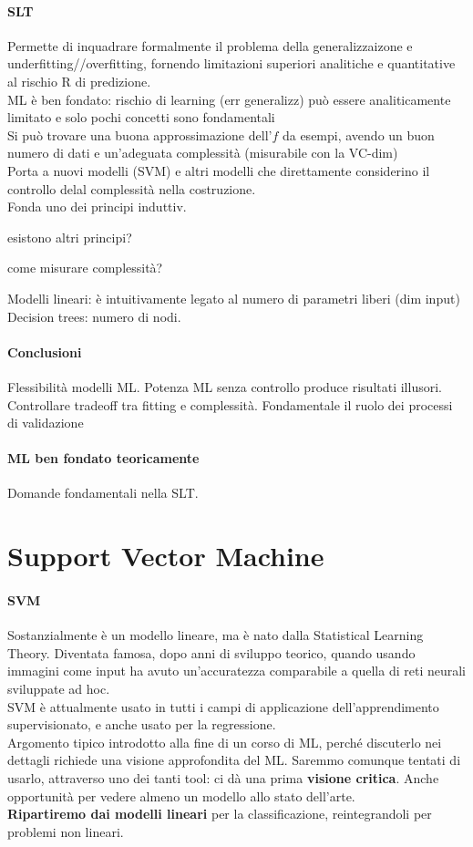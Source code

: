 \documentclass[10pt]{book}
\begin{document}
\paragraph{SLT} Permette di inquadrare formalmente il problema della generalizzaizone e underfitting//overfitting, fornendo limitazioni superiori analitiche e quantitative al rischio R di predizione.\\
ML è ben fondato: rischio di learning (err generalizz) può essere analiticamente limitato e solo pochi concetti sono fondamentali\\
Si può trovare una buona approssimazione dell'$f$ da esempi, avendo un buon numero di dati e un'adeguata complessità (misurabile con la VC-dim)\\
Porta a nuovi modelli (SVM) e altri modelli che direttamente considerino il controllo delal complessità nella costruzione.\\
Fonda uno dei principi induttiv.
\begin{list}{}{}
	\item esistono altri principi?
	\item come misurare complessità?
\end{list}
Modelli lineari:  è intuitivamente legato al numero di parametri liberi (dim input)\\
Decision trees: numero di nodi.
\paragraph{Conclusioni} Flessibilità modelli ML. Potenza ML senza controllo produce risultati illusori. Controllare tradeoff tra fitting e complessità. Fondamentale il ruolo dei processi di validazione
\paragraph{ML ben fondato teoricamente} Domande fondamentali nella SLT.
\section{Support Vector Machine}
\paragraph{SVM} Sostanzialmente è un modello lineare, ma è nato dalla Statistical Learning Theory. Diventata famosa, dopo anni di sviluppo teorico, quando usando immagini come input ha avuto un'accuratezza comparabile a quella di reti neurali sviluppate ad hoc.\\
SVM è attualmente usato in tutti i campi di applicazione dell'apprendimento supervisionato, e anche usato per la regressione.\\
Argomento tipico introdotto alla fine di un corso di ML, perché discuterlo nei dettagli richiede una visione approfondita del ML. Saremmo comunque tentati di usarlo, attraverso uno dei tanti tool: ci dà una prima \textbf{visione critica}. Anche opportunità per vedere almeno un modello allo stato dell'arte.\\
\textbf{Ripartiremo dai modelli lineari} per la classificazione, reintegrandoli per problemi non lineari.
\end{document}
